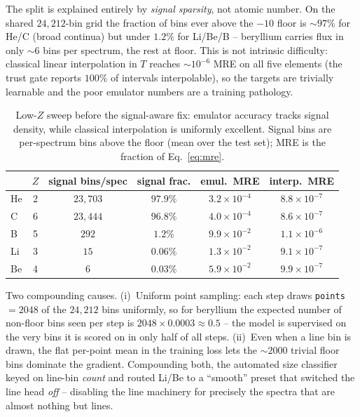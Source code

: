 \documentclass[11pt,a4paper]{article}
\newcommand{\code}[1]{\texttt{#1}}
\begin{document}
The split is explained entirely by \emph{signal sparsity}, not atomic
number. On the shared $24{,}212$-bin grid the fraction of bins ever above
the $-10$ floor is $\sim97\%$ for He/C (broad continua) but under $1.2\%$
for Li/Be/B -- beryllium carries flux in only $\sim6$ bins per spectrum,
the rest at floor. This is not intrinsic difficulty: classical linear
interpolation in $T$ reaches $\sim10^{-6}$ MRE on all five elements (the
trust gate reports $100\%$ of intervals interpolable), so the targets are
trivially learnable and the poor emulator numbers are a training
pathology.

\begin{table}[ht]
\centering
\begin{tabular}{lccccc}
\toprule
 & $Z$ & signal bins/spec & signal frac. & emul.\ MRE & interp.\ MRE\\
\midrule
He & 2 & $23{,}703$ & $97.9\%$   & $3.2\times10^{-4}$ & $8.8\times10^{-7}$\\
C  & 6 & $23{,}444$ & $96.8\%$   & $4.0\times10^{-4}$ & $8.6\times10^{-7}$\\
B  & 5 & $292$      & $1.2\%$    & $9.9\times10^{-2}$ & $1.1\times10^{-6}$\\
Li & 3 & $15$       & $0.06\%$   & $1.3\times10^{-2}$ & $9.1\times10^{-7}$\\
Be & 4 & $6$        & $0.03\%$   & $5.9\times10^{-2}$ & $9.9\times10^{-7}$\\
\bottomrule
\end{tabular}
\caption{Low-$Z$ sweep before the signal-aware fix: emulator accuracy
tracks signal density, while classical interpolation is uniformly
excellent. Signal bins are per-spectrum bins above the floor (mean over
the test set); MRE is the fraction of Eq.~\ref{eq:mre}.}
\label{tab:multielement}
\end{table}

Two compounding causes. (i)~Uniform point sampling: each step draws
\code{points}$=2048$ of the $24{,}212$ bins uniformly, so for beryllium
the expected number of non-floor bins seen per step is
$2048\times0.0003\approx0.5$ -- the model is supervised on the very bins
it is scored on in only half of all steps. (ii)~Even when a line bin is
drawn, the flat per-point mean in the training loss lets the $\sim2000$
trivial floor bins dominate the gradient. Compounding both, the automated
size classifier keyed on line-bin \emph{count} and routed Li/Be to a
``smooth'' preset that switched the line head \emph{off} -- disabling the
line machinery for precisely the spectra that are almost nothing but
lines.
\end{document}
